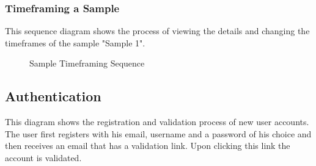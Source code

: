 \subsubsection{Timeframing a Sample}
This sequence diagram shows the process of viewing the details and changing the timeframes of the sample "Sample 1".
\begin{figure}[!htb]
    \centering
    \caption{Sample Timeframing Sequence}
    \label{fig:seq-timeframing-a-sample}
\end{figure}


\subsection{Authentication}

This diagram shows the registration and validation process of new user accounts. The user first registers with his email, username and a password of his choice and then receives an email that has a validation link. Upon clicking this link the account is validated.
